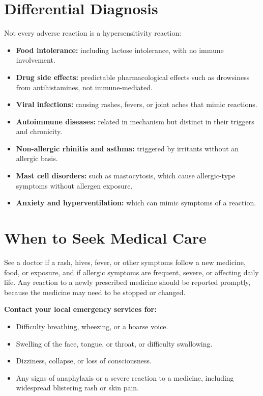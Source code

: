 \section*{Differential Diagnosis}
Not every adverse reaction is a hypersensitivity reaction:

\begin{itemize}
    \item \textbf{Food intolerance:} including lactose intolerance, with no immune involvement.
    \item \textbf{Drug side effects:} predictable pharmacological effects such as drowsiness from antihistamines, not immune-mediated.
    \item \textbf{Viral infections:} causing rashes, fevers, or joint aches that mimic reactions.
    \item \textbf{Autoimmune diseases:} related in mechanism but distinct in their triggers and chronicity.
    \item \textbf{Non-allergic rhinitis and asthma:} triggered by irritants without an allergic basis.
    \item \textbf{Mast cell disorders:} such as mastocytosis, which cause allergic-type symptoms without allergen exposure.
    \item \textbf{Anxiety and hyperventilation:} which can mimic symptoms of a reaction.
\end{itemize}

\section*{When to Seek Medical Care}
See a doctor if a rash, hives, fever, or other symptoms follow a new medicine, food, or exposure, and if allergic symptoms are frequent, severe, or affecting daily life. Any reaction to a newly prescribed medicine should be reported promptly, because the medicine may need to be stopped or changed.

\textbf{Contact your local emergency services for:}
\begin{itemize}
    \item Difficulty breathing, wheezing, or a hoarse voice.
    \item Swelling of the face, tongue, or throat, or difficulty swallowing.
    \item Dizziness, collapse, or loss of consciousness.
    \item Any signs of anaphylaxis or a severe reaction to a medicine, including widespread blistering rash or skin pain.
\end{itemize}

